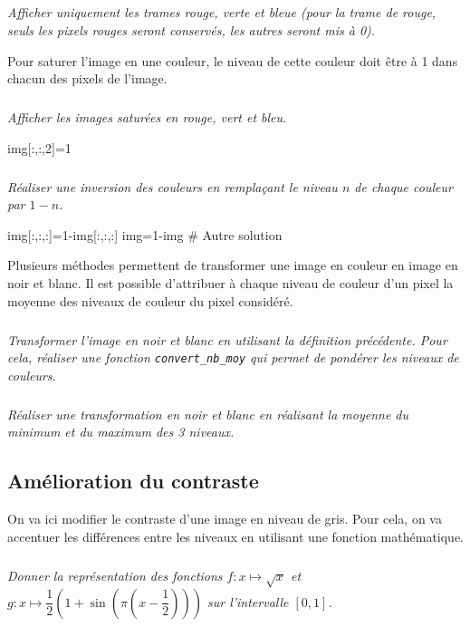 \documentclass[10pt,fleqn]{article} %
\begin{document}
\begin{multicols}{2}
\subparagraph{}\textit{Afficher uniquement les trames rouge, verte et bleue (pour la trame de rouge, seuls les pixels rouges seront conservés, les autres seront mis à 0).}

Pour saturer l'image en une couleur, le niveau de cette couleur doit être à 1 dans chacun des pixels de l'image. 

\subparagraph{}\textit{Afficher les images saturées en rouge, vert et bleu.}
\ifprof
\begin{corrige}
\begin{python}
img[:,:,2]=1
\end{python}
\end{corrige}
\else
\fi

\subparagraph{}\textit{Réaliser une inversion des couleurs en remplaçant le niveau $n$ de chaque couleur par $1-n$.}
\ifprof
\begin{corrige}
\begin{python}
img[:,:,:]=1-img[:,:,:]
img=1-img # Autre solution
\end{python}
\end{corrige}
\else
\fi

\vspace{.5cm}

Plusieurs méthodes permettent de transformer une image en couleur en image en noir et blanc. Il est possible d'attribuer à chaque niveau de couleur d'un pixel la moyenne des niveaux de couleur du pixel considéré. 


\subparagraph{}\textit{Transformer l'image en noir et blanc en utilisant la définition précédente. Pour cela, réaliser une fonction \texttt{convert\_nb\_moy} qui permet de pondérer les niveaux de couleurs.}


\subparagraph{}\textit{Réaliser une transformation en noir et blanc en réalisant la moyenne du minimum et du maximum des 3 niveaux.}

\subsection*{Amélioration du contraste}
On va ici modifier le contraste d'une image en niveau de gris. 
Pour cela, on va accentuer les différences entre les niveaux en utilisant une fonction mathématique. 

\subparagraph{}\textit{Donner la représentation des fonctions $f:x \mapsto \sqrt{x}$ et $g:x\mapsto \dfrac{1}{2}\left(1+\sin\left(\pi\left(x-\dfrac{1}{2}\right)\right)\right)$ sur l'intervalle $[0,1]$.}


\end{multicols}
\end{document}

